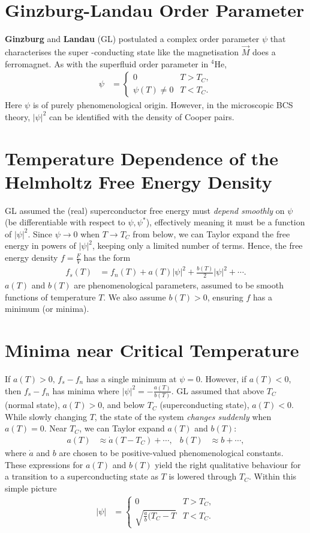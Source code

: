 \documentclass[a4paper, 11pt, normalem]{report}
\begin{document}
\section{Ginzburg-Landau Order Parameter}
\textbf{Ginzburg} and \textbf{Landau} (GL) postulated a complex order parameter $\psi$ that characterises the super -conducting state like the magnetisation $\vec{M}$ does a ferromagnet.
As with the superfluid order parameter in ${}^4$He,
\begin{align}
    \psi &= \begin{cases} 0 & T>T_C, \\ \psi(T) \neq 0 & T<T_C.\end{cases}
\end{align}
Here $\psi$ is of purely phenomenological origin.
However, in the microscopic BCS theory, $|\psi|^2$ can be identified with the density of Cooper pairs.

\section{Temperature Dependence of the Helmholtz Free Energy Density}
GL assumed the (real) superconductor free energy must \emph{depend smoothly} on $\psi$ (be differentiable with respect to $\psi,\psi^*$), effectively meaning it must be a function of $|\psi|^2$.
Since $\psi\to0$ when $T\to T_C$ from below, we can Taylor expand the free energy in powers of $|\psi|^2$, keeping only a limited number of terms.
Hence, the free energy density $f=\frac{F}{V}$ has the form
\begin{align}
    f_s(T) &= f_n(T) + a(T)|\psi|^2 + \frac{b(T)}{2}|\psi|^2+\cdots.
\end{align}
$a(T)$ and $b(T)$ are phenomenological parameters, assumed to be smooth functions of temperature $T$.
We also assume $b(T)>0$, ensuring $f$ has a minimum (or minima).

\section{Minima near Critical Temperature}
If $a(T)>0,\, f_s-f_n$ has a single minimum at $\psi=0$.
However, if $a(T)<0$, then $f_s-f_n$ has minima where $|\psi|^2=-\frac{a(T)}{b(T)}$.
GL assumed that above $T_C$ (normal state), $a(T)>0$, and below $T_C$ (superconducting state), $a(T)<0$.
While slowly changing $T$, the state of the system \emph{changes suddenly} when $a(T)=0$.
Near $T_C$, we can Taylor expand $a(T)$ and $b(T)$:
\begin{align}
    a(T) &\approx \dot{a}(T-T_C) + \cdots, & b(T) &\approx b + \cdots,
\end{align}
where $\dot{a}$ and $b$ are chosen to be positive-valued phenomenological constants.
These expressions for $a(T)$ and $b(T)$ yield the right qualitative behaviour for a transition to a superconducting state as $T$ is lowered through $T_C$.
Within this simple picture
\begin{align}
    |\psi| &= \begin{cases} 0 & T>T_C, \\ \sqrt{\frac{\dot{a}}{b}(T_C-T} & T<T_C. \end{cases}
\end{align}
\end{document}
